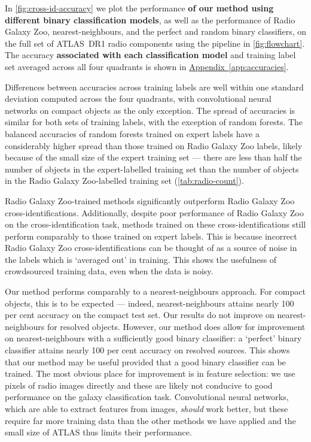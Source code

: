 \documentclass[fleqn,usenatbib,usedcolumn]{mnras}
\newcommand{\edited}[1]{{\bf {#1}}}
\newcommand{\aref}[1]{\hyperref[#1]{Appendix~\ref{#1}}}
\begin{document}
    In \autoref{fig:cross-id-accuracy} we plot the performance \edited{of our
    method using different binary classification models}, as well as the
    performance of Radio Galaxy Zoo, nearest-neighbours, and the perfect and
    random binary classifiers, on the full set of ATLAS~DR1 radio components
    using the pipeline in \autoref{fig:flowchart}. The accuracy
    \edited{associated with each classification model} and training label set
    averaged across all four quadrants is shown in \aref{app:accuracies}.

    Differences between accuracies across training labels are well within one
    standard deviation computed across the four quadrants, with convolutional
    neural networks on compact objects as the only exception. The spread of
    accuracies is similar for both sets of training labels, with the exception
    of random forests. The balanced accuracies of random forests trained on
    expert labels have a considerably higher spread than those trained on
    Radio Galaxy Zoo labels, likely because of the small size of the expert
    training set --- there are less than half the number of objects in the
    expert-labelled training set than the number of objects in the Radio
    Galaxy Zoo-labelled training set (\autoref{tab:radio-count}).

    Radio Galaxy Zoo-trained methods significantly outperform Radio Galaxy Zoo
    cross-identifications. Additionally, despite poor performance of Radio
    Galaxy Zoo on the cross-identification task, methods trained on these
    cross-identifications still perform comparably to those trained on expert
    labels. This is because incorrect Radio Galaxy Zoo cross-identifications
    can be thought of as a source of noise in the labels which is `averaged out'
    in training. This shows the usefulness of crowdsourced training data, even
    when the data is noisy.

    Our method performs comparably to a nearest-neighbours approach. For
    compact objects, this is to be expected --- indeed, nearest-neighbours
    attains nearly 100 per cent accuracy on the compact test set. Our results
    do not improve on nearest-neighbours for resolved objects. However, our
    method does allow for improvement on nearest-neighbours with a
    sufficiently good binary classifier: a `perfect' binary classifier attains
    nearly 100 per cent accuracy on resolved sources. This shows that our
    method may be useful provided that a good binary classifier can be
    trained. The most obvious place for improvement is in feature selection:
    we use pixels of radio images directly and these are likely not conducive
    to good performance on the galaxy classification task. Convolutional
    neural networks, which are able to extract features from images,
    \emph{should} work better, but these require far more training data than
    the other methods we have applied and the small size of ATLAS thus limits their performance.
\end{document}
